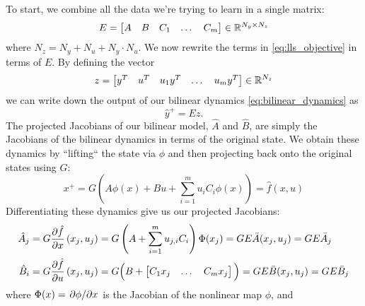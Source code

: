 \documentclass{article}
\begin{document}
To start, we combine all the data we're trying to learn in a single matrix:
\begin{equation}
    E = \begin{bmatrix} A & B & C_1 & \dots & C_m \end{bmatrix} \in \mathbb{R}^{N_y \times N_z} \\
\end{equation}
where $N_z = N_y + N_u + N_y \cdot N_u$.
We now rewrite the terms in \eqref{eq:lls_objective} in terms of $E$. By defining the vector 
\begin{equation}
    z = \begin{bmatrix} y^T & u^T & u_1 y^T & \dots & u_m y^T \end{bmatrix} \in \mathbb{R}^{N_z} 
\end{equation}
we can write down 
the output of our bilinear dynamics \eqref{eq:bilinear_dynamics} as 
\begin{equation} \label{eq:bilinear_dynamics_z}
    \hat{y}^+ = E z.
\end{equation}
The projected Jacobians of our bilinear model, $\hat{A}$ and $\hat{B}$, are simply the Jacobians 
of the bilinear dynamics in terms of the original state. We obtain these dynamics by ``lifting`` 
the state via $\phi$ and then projecting back onto the original states using $G$:
\begin{equation} \label{eq:projected_dynamics}
    x^+ = G \left( A \phi(x) + B u + \sum_{i=1}^m u_i C_i \phi(x) \right)  = \hat{f}(x,u) 
\end{equation}
Differentiating these dynamics give us our projected Jacobians:
\begin{subequations} \label{eq:projected_jacobians}
\begin{align}
    \hat{A}_j &= G \pdv{\hat{f}}{x}\left(x_j,u_j\right) 
               = G \left(A + \sum_{i=1}^m u_{j,i} C_i \right) \Phi(x_j)
               = G E \bar{A}(x_j,u_j) = G E \bar{A}_j \\
    \hat{B}_i &= G \pdv{\hat{f}}{u}\left(x_j,u_j\right) 
               = G \Big(B + \begin{bmatrix} C_1 x_j & \dots & C_m x_j \end{bmatrix} \Big)
               = G E \bar{B}(x_j,u_j) = G E \bar{B}_j
\end{align}
\end{subequations}
where $\Phi(x) = \pdv*{\phi}{x}$ is the Jacobian of the nonlinear map $\phi$, and
\end{document}
